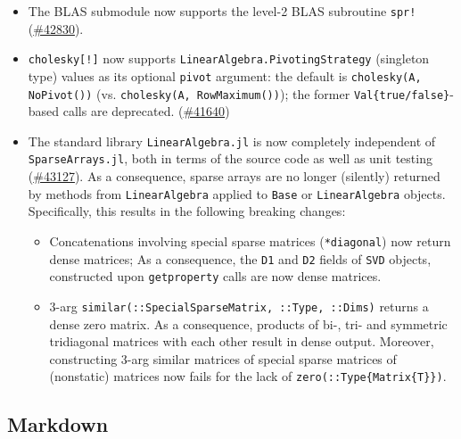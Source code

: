 \begin{itemize}
\item The BLAS submodule now supports the level-2 BLAS subroutine \texttt{spr!} (\href{https://github.com/JuliaLang/julia/issues/42830}{\#42830}).


\item \texttt{cholesky[!]} now supports \texttt{LinearAlgebra.PivotingStrategy} (singleton type) values as its optional \texttt{pivot} argument: the default is \texttt{cholesky(A, NoPivot())} (vs. \texttt{cholesky(A, RowMaximum())}); the former \texttt{Val\{true/false\}}-based calls are deprecated. (\href{https://github.com/JuliaLang/julia/issues/41640}{\#41640})


\item The standard library \texttt{LinearAlgebra.jl} is now completely independent of \texttt{SparseArrays.jl}, both in terms of the source code as well as unit testing (\href{https://github.com/JuliaLang/julia/issues/43127}{\#43127}). As a consequence, sparse arrays are no longer (silently) returned by methods from \texttt{LinearAlgebra} applied to \texttt{Base} or \texttt{LinearAlgebra} objects. Specifically, this results in the following breaking changes:

\begin{itemize}
\item Concatenations involving special {\textquotedbl}sparse{\textquotedbl} matrices (\texttt{*diagonal}) now return dense matrices; As a consequence, the \texttt{D1} and \texttt{D2} fields of \texttt{SVD} objects, constructed upon \texttt{getproperty} calls are now dense matrices.


\item 3-arg \texttt{similar(::SpecialSparseMatrix, ::Type, ::Dims)} returns a dense zero matrix. As a consequence, products of bi-, tri- and symmetric tridiagonal matrices with each other result in dense output. Moreover, constructing 3-arg similar matrices of special {\textquotedbl}sparse{\textquotedbl} matrices of (nonstatic) matrices now fails for the lack of \texttt{zero(::Type\{Matrix\{T\}\})}.

\end{itemize}
\end{itemize}


\hypertarget{1148945260684419988}{}


\subsection{Markdown}



